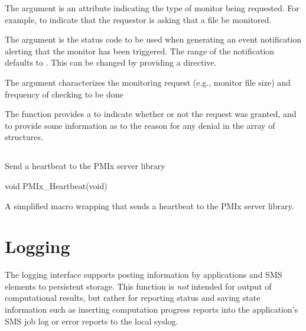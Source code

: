 The  argument is an attribute indicating the type of monitor being requested.
For example,  to indicate that the requestor is asking that a file be monitored.

The  argument is the status code to be used when generating an event notification alerting that the monitor has been triggered.
The range of the notification defaults to .
This can be changed by providing a  directive.

The  argument characterizes the monitoring request (e.g., monitor file size) and frequency of checking to be done

The  function provides a  to indicate whether or not the request was granted, and to provide some information as to the reason for any denial in the  array of  structures.


\subsection{}

\summary

Send a heartbeat to the \ac{PMIx} server library

\format

\cspecificstart
\begin{codepar}
void PMIx_Heartbeat(void)
\end{codepar}
\cspecificend


\descr

A simplified macro wrapping  that sends a heartbeat to the \ac{PMIx} server library.


\section{Logging}
\label{chap:api_job_mgmt:logging}

The logging interface supports posting information by applications and SMS elements to persistent storage. This function is \textit{not} intended for output of computational results, but rather for reporting status and saving state information such as inserting computation progress reports into the application's \ac{SMS} job log or error reports to the local syslog.

